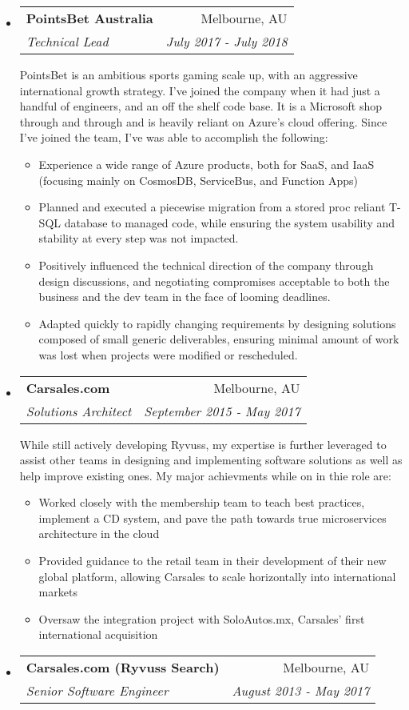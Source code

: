\documentclass[letterpaper,11pt]{article}
\makeatletter
\newcommand{\resitem}[1]{\item #1 \vspace{-2pt}}
\newcommand{\ressubheading}[4]{
\begin{tabular*}{6.5in}{l@{\cftdotfill{\cftsecdotsep}\extracolsep{\fill}}r}
		\textbf{#1} & #2 \\
		\textit{#3} & \textit{#4} \\
\end{tabular*}}
\makeatother
\begin{document}
\begin{itemize}
\item[]
	\ressubheading{PointsBet Australia}{Melbourne, AU}{Technical Lead}{July 2017 - July 2018}
	
	PointsBet is an ambitious sports gaming scale up, with an aggressive international growth strategy. I've joined the company when it had just a handful of engineers, and an off the shelf code base. It is a Microsoft shop through and through and is heavily reliant on Azure's cloud offering. Since I've joined the team, I've was able to accomplish the following:
	
	\begin{itemize}
		\resitem{Experience a wide range of Azure products, both for SaaS, and IaaS (focusing mainly on CosmosDB, ServiceBus, and Function Apps)}
		\resitem{Planned and executed a piecewise migration from a stored proc reliant T-SQL database to managed code, while ensuring the system usability and stability at every step was not impacted.}
		\resitem{Positively influenced the technical direction of the company through design discussions, and negotiating compromises acceptable to both the business and the dev team in the face of looming deadlines.}
		\resitem{Adapted quickly to rapidly changing requirements by designing solutions composed of small generic deliverables, ensuring minimal amount of work was lost when projects were modified or rescheduled.}
	\end{itemize}
	
\vfil \break
	
\item[]
	\ressubheading{Carsales.com}{Melbourne, AU}{Solutions Architect}{September 2015 - May 2017}

	While still actively developing Ryvuss, my expertise is further leveraged to assist other teams in designing and implementing software solutions as well as help improve existing ones. My major achievments while on in thie role are:
	\begin{itemize}
		\resitem{Worked closely with the membership team to teach best practices, implement a CD system, and pave the path towards true microservices architecture in the cloud}
		\resitem{Provided guidance to the retail team in their development of their new global platform, allowing Carsales to scale horizontally into international markets}
		\resitem{Oversaw the integration project with SoloAutos.mx, Carsales' first international acquisition}
	\end{itemize}
	
\item[]
	\ressubheading{Carsales.com (Ryvuss Search)}{Melbourne, AU}{Senior Software Engineer}{August 2013 - May 2017}
	

\end{itemize}
\end{document}
